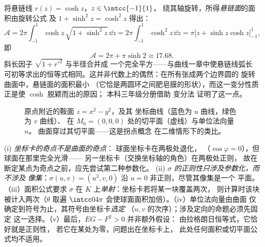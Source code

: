 \begin{example}[悬链面]\label{ex:b2:surfaces:catenoid}
将悬链线 $r(z) = \cosh z$，$z \in \intcc{-1}{1}$，
绕其轴旋转，所得\emph{悬链面}的面积由旋转公式
及 $1 + \sinh^2 z = \cosh^2 z$ 得出：
\[
\mathcal A = 2\pi\int_{-1}^1\cosh z\,\sqrt{1 + \sinh^2z}\,
\dd z = 2\pi\int_{-1}^1\cosh^2z\,\dd z
= \pi\bigl[z + \sinh z\cosh z\bigr]_{-1}^{1},
\]
即
\[
\mathcal A = 2\pi + \pi\sinh 2 \approx 17.68 .
\]
斜长因子 $\sqrt{1 + r'^2}$ 与半径合并成
一个完全平方——与曲线一章中使悬链线弧长
可初等求出的恒等式相同。这并非代数上的偶然：在所有张成两个边界圆的
旋转曲面中，悬链面的面积最小
（它恰是两圆环之间肥皂膜的形状），而这一变分性质
正是使 $\cosh$ 脱颖而出的原因；
本科三年级分册借助
变分法
证明了这一点。
\end{example}

\begin{figure}[ht]
\centering
{}
\caption{原点附近的鞍面 $z = x^2 - y^2$，及其
坐标曲线（蓝色为 $u$ 曲线，绿色为 $v$ 曲线）、
在 $M_0 = (0,0,0)$ 处的切平面（虚线）与单位法向量 $n$。
曲面穿过其切平面——这是拐点概念
在二维情形下的类比。}
\label{fig:b2:surfaces:saddle}
\end{figure}

\begin{remark}[常见误区]
(i) \emph{坐标卡的奇点不是曲面的奇点}：
球面坐标卡在两极处退化，
（$\cos\varphi = 0$），但球面在那里完全光滑——
另一坐标卡（交换坐标轴的角色）在两极处正则，
故在断定某点为奇点之前，应先尝试第二种参数化。
(ii) \emph{$\sigma$ 的正则性只涉及参数化，而不涉及
像集}：$\sigma(u, v) = (u^3, v,
0)$ 沿 $u = 0$ 非正则，尽管其像集是一个
平面。（iii）面积公式要求 $\sigma$
在 $K$ 上\emph{单射}：坐标卡若将某一块覆盖两次，
则计算时该块被计入两次（$\theta$ 取遍 $\intcc0{4\pi}$
会使球面面积加倍）。（iv）单位法向量由曲面
仅确定到符号为止，其符号由坐标卡\emph{选定}
（$u, v$ 的次序）；涉及定向的命题必须先固定
这一选择。（v）最后，$EG - F^2 > 0$ 并非额外假设：
由拉格朗日恒等式，它恰好就是正则性，
若它在某处为零，问题出在坐标卡上，
此处任何面积或切平面公式均不适用。
\end{remark}

